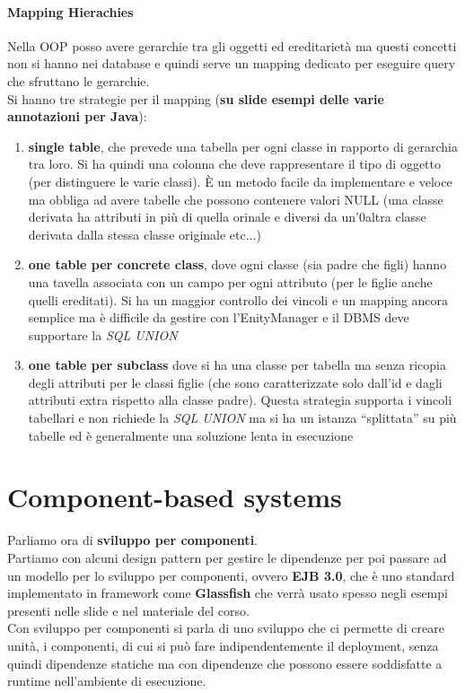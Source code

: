 \documentclass[a4paper,12pt, oneside]{book}
\begin{document}
\subsubsection{Mapping Hierachies}
Nella OOP posso avere gerarchie tra gli oggetti ed ereditarietà ma questi
concetti non si hanno nei database e quindi serve un mapping dedicato per
eseguire query che sfruttano le gerarchie.\\
Si hanno tre strategie per il mapping (\textbf{su slide esempi delle varie
  annotazioni per Java}):
\begin{enumerate}
  \item \textbf{single table}, che prevede una tabella per ogni classe in
  rapporto di gerarchia tra loro. Si ha quindi una colonna che deve
  rappresentare il tipo di oggetto (per distinguere le varie classi). È un
  metodo facile da implementare e veloce ma obbliga ad avere tabelle che possono
  contenere valori NULL (una classe derivata ha attributi in più di quella
  orinale e diversi da un'0altra classe derivata dalla stessa classe originale
  etc$\ldots$) 
  \item \textbf{one table per concrete class}, dove ogni classe (sia padre che
  figli) hanno una tavella associata con un campo per ogni attributo (per le
  figlie anche quelli ereditati). Si ha un maggior controllo dei vincoli e un
  mapping ancora semplice ma è difficile da gestire con l'EnityManager e il DBMS
  deve supportare la \textit{SQL UNION}
  \item \textbf{one table per subclass} dove si ha una classe per tabella ma
  senza ricopia degli attributi per le classi figlie (che sono caratterizzate
  solo dall'id e dagli attributi extra rispetto alla classe padre). Questa
  strategia supporta i vincoli tabellari e non richiede la \textit{SQL UNION} ma
  si ha un istanza ``splittata'' su più tabelle ed è generalmente una soluzione
  lenta in esecuzione 
\end{enumerate}
\chapter{Component-based systems}
Parliamo ora di \textbf{sviluppo per componenti}.\\
Partiamo con alcuni design pattern per gestire le dipendenze per poi passare ad
un modello per lo sviluppo per componenti, ovvero \textbf{EJB 
3.0}, che è uno standard implementato in framework come \textbf{Glassfish} che
verrà usato spesso negli esempi presenti nelle slide e nel materiale del
corso.\\
Con sviluppo per componenti si parla di uno sviluppo che ci permette di creare
unità, i componenti, di cui si può fare indipendentemente il deployment, senza
quindi dipendenze statiche ma con dipendenze che possono essere soddisfatte a
runtime nell'ambiente di esecuzione.
\end{document}
